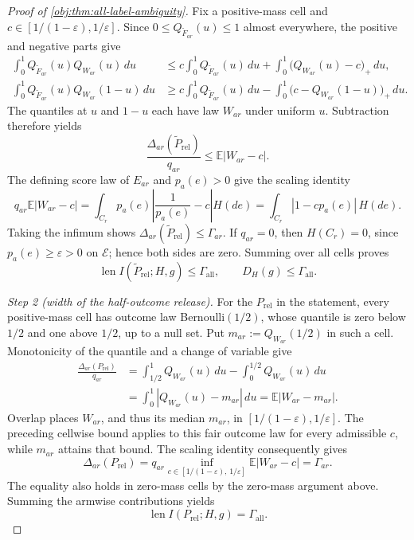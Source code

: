 \documentclass[11pt]{article}
\begin{document}
\begin{proof}[Proof of \cref{obj:thm:all-label-ambiguity}]
Fix a positive-mass cell and \(c\in[1/(1-\varepsilon),1/\varepsilon]\). Since \(0\le Q_{\widetilde F_{ar}}(u)\le1\) almost everywhere, the positive and negative parts give
\[
\begin{aligned}
\int_0^1 Q_{\widetilde F_{ar}}(u)Q_{W_{ar}}(u)\,du
&\le c\int_0^1Q_{\widetilde F_{ar}}(u)\,du
   +\int_0^1\bigl(Q_{W_{ar}}(u)-c\bigr)_+\,du,\\
\int_0^1 Q_{\widetilde F_{ar}}(u)Q_{W_{ar}}(1-u)\,du
&\ge c\int_0^1Q_{\widetilde F_{ar}}(u)\,du
   -\int_0^1\bigl(c-Q_{W_{ar}}(1-u)\bigr)_+\,du.
\end{aligned}
\]
The quantiles at \(u\) and \(1-u\) each have law \(W_{ar}\) under uniform \(u\). Subtraction therefore yields
\[
\frac{\Delta_{ar}(\widetilde P_{\mathrm{rel}})}{q_{ar}}
\le \mathbb E|W_{ar}-c|.
\]
The defining score law of \(E_{ar}\) and \(p_a(e)>0\) give the scaling identity
\[
q_{ar}\mathbb E|W_{ar}-c|
=\int_{C_r}p_a(e)\left|\frac1{p_a(e)}-c\right|H(de)
=\int_{C_r}|1-cp_a(e)|\,H(de).
\]
Taking the infimum shows \(\Delta_{ar}(\widetilde P_{\mathrm{rel}})\le\Gamma_{ar}\). If \(q_{ar}=0\), then \(H(C_r)=0\), since \(p_a(e)\ge\varepsilon>0\) on \(\mathcal E\); hence both sides are zero. Summing over all cells proves
\[
\operatorname{len}I(\widetilde P_{\mathrm{rel}};H,g)
\le\Gamma_{\mathrm{all}},
\qquad D_H(g)\le\Gamma_{\mathrm{all}}.
\]

\textit{Step 2 (width of the half-outcome release).}
For the \(P_{\mathrm{rel}}\) in the statement, every positive-mass cell has outcome law Bernoulli\((1/2)\), whose quantile is zero below \(1/2\) and one above \(1/2\), up to a null set. Put \(m_{ar}:=Q_{W_{ar}}(1/2)\) in such a cell. Monotonicity of the quantile and a change of variable give
\[
\begin{aligned}
\frac{\Delta_{ar}(P_{\mathrm{rel}})}{q_{ar}}
&=\int_{1/2}^1Q_{W_{ar}}(u)\,du
  -\int_0^{1/2}Q_{W_{ar}}(u)\,du\\
&=\int_0^1|Q_{W_{ar}}(u)-m_{ar}|\,du
 =\mathbb E|W_{ar}-m_{ar}|.
\end{aligned}
\]
Overlap places \(W_{ar}\), and thus its median \(m_{ar}\), in
\([1/(1-\varepsilon),1/\varepsilon]\). The preceding cellwise bound applies to this fair outcome law for every admissible \(c\), while \(m_{ar}\) attains that bound. The scaling identity consequently gives
\[
\Delta_{ar}(P_{\mathrm{rel}})
=q_{ar}\inf_{c\in[1/(1-\varepsilon),\,1/\varepsilon]}
       \mathbb E|W_{ar}-c|
=\Gamma_{ar}.
\]
The equality also holds in zero-mass cells by the zero-mass argument above. Summing the armwise contributions yields
\[
\operatorname{len}I(P_{\mathrm{rel}};H,g)
=\Gamma_{\mathrm{all}}.
\]


\end{proof}
\end{document}
